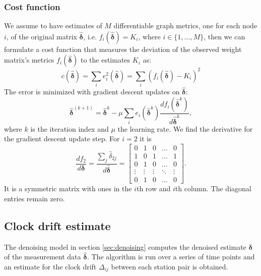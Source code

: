\documentclass[12pt, sumlimits, intlimits]{article}
\begin{document}
\subsubsection{Cost function}
We assume to have estimates of $M$ differentiable graph metrics, one for each node $i$, of the original matrix $\bm{\hat{\delta}}$, i.e. $f_i(\bm{\hat{\delta}}) = K_i$, where $i\in\{ 1,\dots, M \}$, then we can formulate a cost function that measures the deviation of the observed weight matrix's metrics $f_i(\bm{\hat{\delta}})$ to the estimates $K_i$ as: 
\begin{equation}
c(\bm{\hat{\delta}}) = \sum_i e_i^2(\bm{\hat{\delta}}) = \sum_i(f_i(\bm{\hat{\delta}})-K_i)^2
\end{equation}
The error is minimized with gradient descent updates on $\bm{\hat{\delta}}$: 
\begin{equation}
\bm{\hat{\delta}}^{(k+1)} = \bm{\hat{\delta}}^k-\mu\sum_i e_i(\bm{\hat{\delta}}^k)\frac{df_i(\bm{\hat{\delta}}^k)}{d\bm{\hat{\delta}}^k},
\label{eq:updates}
\end{equation}
where $k$ is the iteration index and $\mu$ the learning rate. %
We find the derivative for the gradient descent update step. For $i=2$ it is
\begin{equation}
\frac{df_2}{d\bm{\delta}}=\frac{\sum_j \hat{\delta}_{2j}}{d\bm{\hat{\delta}}}=
\begin{bmatrix}
0 & 1 & 0 & \dots  & 0 \\
1 & 0 & 1 & \dots  & 1 \\
0 & 1 & 0 & \dots  & 0 \\
\vdots & \vdots & \vdots & \ddots & \vdots \\
0 & 1 & 0 & \dots  & 0
\end{bmatrix}.
\end{equation}
It is a symmetric matrix with ones in the $i$th row and $i$th column. The diagonal entries remain zero.

\subsection{Clock drift estimate}

The denoising model in section \ref{sec:denoising} computes the denoised estimate $\bm{\delta}$ of the measurement data $\bm{\hat{\delta}}$. The algorithm is run over a series of time points and an estimate for the clock drift $\Delta_{ij}$ between each station pair is obtained. 
\end{document}
